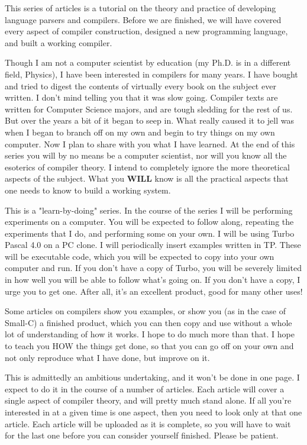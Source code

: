 
This series of articles is a tutorial on the theory  and practice
of  developing language parsers and compilers.    Before  we  are
finished,  we  will  have  covered  every   aspect   of  compiler
construction, designed a new programming  language,  and  built a
working compiler.

Though I am not a computer scientist by education (my Ph.D. is in a different 
field, Physics), I have been interested in compilers for many years.  I have 
bought  and tried to digest the contents of virtually every  book  on  the 
subject ever written.  I don't mind  telling you that it was slow going.   
Compiler  texts  are written for Computer  Science  majors, and are tough
sledding for the rest of us.  But over the years a bit of it began to seep in.
What really caused it to jell was when I began  to  branch off on my own and
begin to try things on my own computer.  Now I plan to share with you what I
have  learned.    At the end of this series you will by no means be  a  computer
scientist, nor will you know all the esoterics of  compiler  theory.    I intend
to completely ignore the more theoretical  aspects  of  the  subject.  What
you \textbf{WILL} know is all  the  practical aspects that one needs to know to
build a working system.

This is a "learn-by-doing" series.  In the course of the series I
will be performing  experiments  on  a  computer.    You  will be
expected to follow along,  repeating  the  experiments that I do,
and  performing  some  on your own.  I will be using Turbo Pascal
4.0 on a PC  clone.   I will periodically insert examples written
in TP.  These will be executable code, which you will be expected
to copy into your own computer and run.  If you don't have a copy
of  Turbo,  you  will be severely limited in how well you will be
able to follow what's going on.  If you don't have a copy, I urge
you to get one.  After  all,  it's an excellent product, good for
many other uses!

Some articles on compilers show you examples, or show you  (as in
the case of Small-C) a finished product, which you can  then copy
and  use without a whole lot of understanding of how it works.  I
hope to do much more  than  that.    I  hope to teach you HOW the
things get done,  so that you can go off on your own and not only
reproduce what I have done, but improve on it.
                              
This is admittedly an ambitious undertaking, and it won't be done
in  one page.  I expect to do it in the course  of  a  number  of
articles.    Each  article will cover a single aspect of compiler
theory,  and  will  pretty  much  stand  alone.   If  all  you're
interested in at a given time is one  aspect,  then  you  need to
look only at that one article.  Each article will be  uploaded as
it  is complete, so you will have to wait for the last one before
you can consider yourself finished.  Please be patient.

